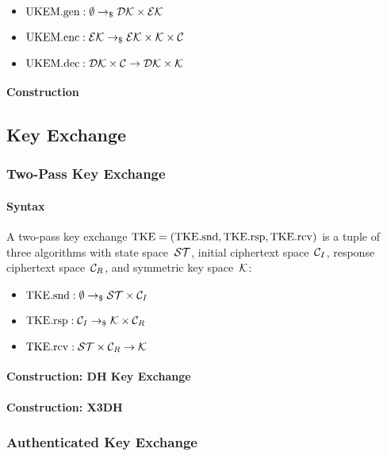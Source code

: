 \documentclass[a4paper,orivec]{llncs}
\begin{document}
\begin{itemize}
    \item $\mathrm{UKEM}.\mathrm{gen}: \emptyset \to_\$ \mathcal{DK}\times\mathcal{EK}$
    \item $\mathrm{UKEM}.\mathrm{enc}: \mathcal{EK} \to_\$ \mathcal{EK}\times\mathcal{K}\times\mathcal{C}$
    \item $\mathrm{UKEM}.\mathrm{dec}: \mathcal{DK}\times\mathcal{C} \to \mathcal{DK}\times\mathcal{K}$
\end{itemize}

\paragraph{Construction}


\subsection{Key Exchange}

\subsubsection{Two-Pass Key Exchange}

\paragraph{Syntax}
A two-pass key exchange $\mathrm{TKE}=(\mathrm{TKE}.\mathrm{snd},\mathrm{TKE}.\mathrm{rsp},\mathrm{TKE}.\mathrm{rcv})$ is a tuple of three algorithms with state space~$\mathcal{ST}$, initial ciphertext space~$\mathcal{C}_I$, response ciphertext space~$\mathcal{C}_R$, and symmetric key space~$\mathcal{K}$:

\begin{itemize}
    \item $\mathrm{TKE}.\mathrm{snd}: \emptyset \to_\$ \mathcal{ST}\times\mathcal{C}_I$
    \item $\mathrm{TKE}.\mathrm{rsp}: \mathcal{C}_I \to_\$ \mathcal{K}\times\mathcal{C}_R$
    \item $\mathrm{TKE}.\mathrm{rcv}: \mathcal{ST}\times\mathcal{C}_R \to \mathcal{K}$
\end{itemize}

\paragraph{Construction: DH Key Exchange}

\paragraph{Construction: X3DH}

\subsubsection{Authenticated Key Exchange}
\end{document}
